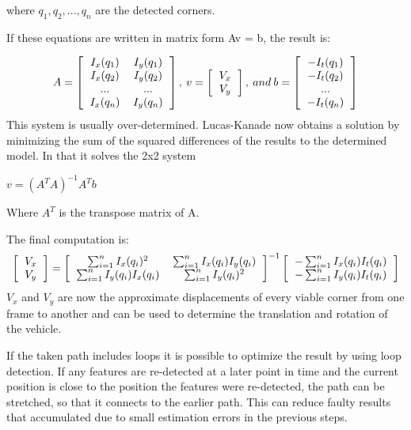 where $q_1, q_2, ..., q_n$ are the detected corners.

If these equations are written in matrix form Av = b, the result is: 

\[ 
A=
\left[
  \begin{tabular}{cc}
  $I_x(q_1)$ & $I_y(q_1)$ \\
  $I_x(q_2)$ & $I_y(q_2)$ \\
  ... & ... \\
  $I_x(q_n)$ & $I_y(q_n)$ \\
  \end{tabular}
\right],\:
v =
\left[
	\begin{tabular}{c}
	$V_x$\\
	$V_y$
	\end{tabular}
\right],\:
and\: b = 
\left[
	\begin{tabular}{c}
	$-I_t(q_1)$\\
	$-I_t(q_2)$\\
	...\\
	$-I_t(q_n)$\\
	\end{tabular}
\right]
\]
This system is usually over-determined. Lucas-Kanade now obtains a solution by minimizing the sum of the squared differences of the results to the determined model.
In that it solves the 2x2 system

	$v = (A^T A)^{-1} A^T b$

Where $A^T$ is the transpose matrix of A.

The final computation is:
\[
\left[
\begin{tabular}{c}
	$V_x$ \\
	$V_y$
\end{tabular}
\right]
= 
\left[
\begin{tabular}{cc}
	$\sum_{i = 1}^n I_x(q_i)^2$ & $\sum_{i = 1}^n I_x(q_i) I_y(q_i)$ \\
	$\sum_{i = 1}^n I_y(q_i) I_x(q_i)$ & $\sum_{i = 1}^n I_y(q_i)^2$
\end{tabular}
\right]
^{-1}
\left[
\begin{tabular}{c}
	$- \sum_{i = 1}^n I_x(q_i) I_t(q_i)$ \\
	$- \sum_{i = 1}^n I_y(q_i) I_t(q_i)$ 
\end{tabular}
\right]
\]
$V_x$ and $V_y$ are now the approximate displacements of every viable corner from one frame to another and can be used to determine the translation and rotation of the vehicle.

If the taken path includes loops it is possible to optimize the result by using loop detection. If any features are re-detected at a later point in time and the current position is close to the position the features were re-detected, the path can be stretched, so that it connects to the earlier path.
This can reduce faulty results that accumulated due to small estimation errors in the previous steps.

